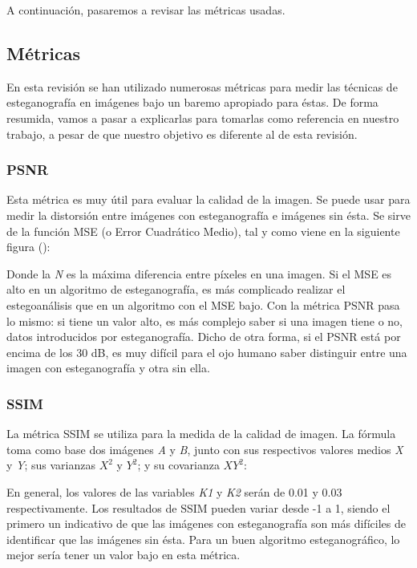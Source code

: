A continuación, pasaremos a revisar las métricas usadas.

\subsection{Métricas}

En esta revisión se han utilizado numerosas métricas para medir las técnicas de esteganografía en imágenes bajo un baremo apropiado para éstas. De forma resumida, vamos a pasar a explicarlas para tomarlas como referencia en nuestro trabajo, a pesar de que nuestro objetivo es diferente al de esta revisión.

\subsubsection{PSNR}

Esta métrica es muy útil para evaluar la calidad de la imagen. Se puede usar para medir la distorsión entre imágenes con esteganografía e imágenes sin ésta. Se sirve de la función \ac{MSE} (o Error Cuadrático Medio), tal y como viene en la siguiente figura (\cite{mse-ssim}): %




Donde la \textit{N} es la máxima diferencia entre píxeles en una imagen. Si el \ac{MSE} es alto en un algoritmo de esteganografía, es más complicado realizar el estegoanálisis que en un algoritmo con el \ac{MSE} bajo. Con la métrica \ac{PSNR} pasa lo mismo: si tiene un valor alto, es más complejo saber si una imagen tiene o no, datos introducidos por esteganografía. Dicho de otra forma, si el \ac{PSNR} está por encima de los 30 dB, es muy difícil para el ojo humano saber distinguir entre una imagen con esteganografía y otra sin ella.

\subsubsection{SSIM}

La métrica \ac{SSIM} se utiliza para la medida de la calidad de imagen. La fórmula toma como base dos imágenes \textit{A} y \textit{B}, junto con sus respectivos valores medios \textit{X} y \textit{Y}; sus varianzas $X^{2}$ y $Y^{2}$; y su covarianza $XY^{2}$:


En general, los valores de las variables \textit{K1} y \textit{K2} serán de 0.01 y 0.03 respectivamente. Los resultados de \ac{SSIM} pueden variar desde -1 a 1, siendo el primero un indicativo de que las imágenes con esteganografía son más difíciles de identificar que las imágenes sin ésta. Para un buen algoritmo esteganográfico, lo mejor sería tener un valor bajo en esta métrica.

